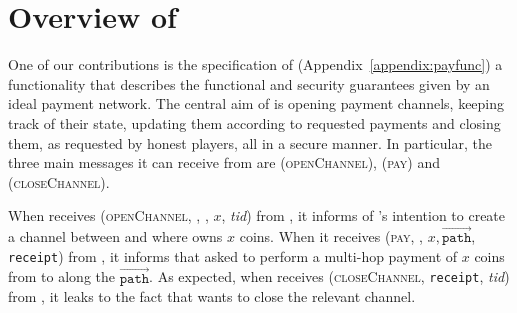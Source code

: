 \section{Overview of \fpaynet{}}
\label{sec:ov-paynet}
  One of our contributions is the specification of \fpaynet{}
  (Appendix~\ref{appendix:payfunc}) a functionality that describes the
  functional and security guarantees given by an ideal payment network. The
  central aim of \fpaynet{} is opening payment channels, keeping
  track of their state, updating them according to requested payments and
  closing them, as requested by honest players, all in a secure manner. In
  particular, the three main messages it can receive from \alice{} are
  (\textsc{openChannel}), (\textsc{pay}) and (\textsc{closeChannel}).

  When \fpaynet{} receives (\textsc{openChannel}, \alice, \bob, $x$,
  \textit{tid}) from \alice, it informs \simulator{} of \environment's intention
  to create a channel between \alice{} and \bob{} where \alice{} owns $x$ coins.
  When it receives (\textsc{pay}, \bob, $x, \overrightarrow{\mathtt{path}}$,
  \texttt{receipt}) from \alice, it informs \simulator{} that \environment{}
  asked to perform a multi-hop payment of $x$ coins from \alice{} to \bob{}
  along the $\overrightarrow{\mathtt{path}}$. As expected, when \fpaynet{}
  receives (\textsc{closeChannel}, \texttt{receipt}, \textit{tid}) from \alice,
  it leaks to \simulator{} the fact that \environment{} wants to close the
  relevant channel.

